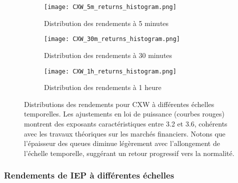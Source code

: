 \documentclass[12pt,a4paper]{article}
\theoremstyle{definition}
\theoremstyle{remark}
\begin{document}
\begin{figure}[H]
    \centering
    \begin{subfigure}[b]{0.45\textwidth}
        \texttt{[image: CXW\_5m\_returns\_histogram.png]}
        \caption{Distribution des rendements à 5 minutes}
        \label{fig:CXW_5m_moved}
    \end{subfigure}
    \hfill
    \begin{subfigure}[b]{0.45\textwidth}
        \texttt{[image: CXW\_30m\_returns\_histogram.png]}
        \caption{Distribution des rendements à 30 minutes}
        \label{fig:CXW_30m_moved}
    \end{subfigure}
    
    \vspace{0.5cm}
    
    \begin{subfigure}[b]{0.45\textwidth}
        \texttt{[image: CXW\_1h\_returns\_histogram.png]}
        \caption{Distribution des rendements à 1 heure}
        \label{fig:CXW_1h_moved}
    \end{subfigure}
    \caption{Distributions des rendements pour CXW à différentes échelles temporelles. Les ajustements en loi de puissance (courbes rouges) montrent des exposants caractéristiques entre 3.2 et 3.6, cohérents avec les travaux théoriques sur les marchés financiers. Notons que l'épaisseur des queues diminue légèrement avec l'allongement de l'échelle temporelle, suggérant un retour progressif vers la normalité.}
    \label{fig:CXW_multi_scale_moved}
\end{figure}

\subsubsection{Rendements de IEP à différentes échelles}
\end{document}
